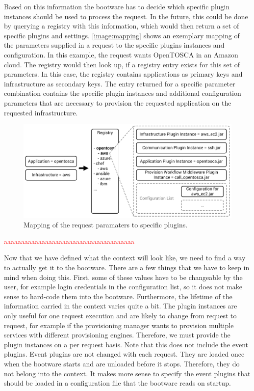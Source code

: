 Based on this information the bootware has to decide which specific plugin instances should be used to process the request.
In the future, this could be done by querying a registry with this information, which would then return a set of specific plugins and settings.
\autoref{image:mapping} shows an exemplary mapping of the parameters supplied in a request to the specific plugins instances and configuration.
In this example, the request wants OpenTOSCA in an Amazon cloud.
The registry would then look up, if a registry entry exists for this set of parameters.
In this case, the registry contains applications as primary keys and infrastructure as secondary keys.
The entry returned for a specific parameter combination contains the specific plugin instances and additional configuration parameters that are necessary to provision the requested application on the requested infrastructure.

\begin{figure}[!htbp]
	\centering
	\includegraphics[resolution=600]{design/assets/mapping}
	\caption{Mapping of the request paramaters to specific plugins.}
	\label{image:mapping}
\end{figure}

\textcolor{red}{aaaaaaaaaaaaaaaaaaaaaaaaaaaaaaaaaaaaaa}

Now that we have defined what the context will look like, we need to find a way to actually get it to the bootware.
There are a few things that we have to keep in mind when doing this.
First, some of these values have to be changeable by the user, for example login credentials in the configuration list, so it does not make sense to hard-code them into the bootware.
Furthermore, the lifetime of the information carried in the context varies quite a bit.
The plugin instances are only useful for one request execution and are likely to change from request to request, for example if the provisioning manager wants to provision multiple services with different provisioning engines.
Therefore, we must provide the plugin instances on a per request basis.
Note that this does not include the event plugins.
Event plugins are not changed with each request.
They are loaded once when the bootware starts and are unloaded before it stops.
Therefore, they do not belong into the context.
It makes more sense to specify the event plugins that should be loaded in a configuration file that the bootware reads on startup.

